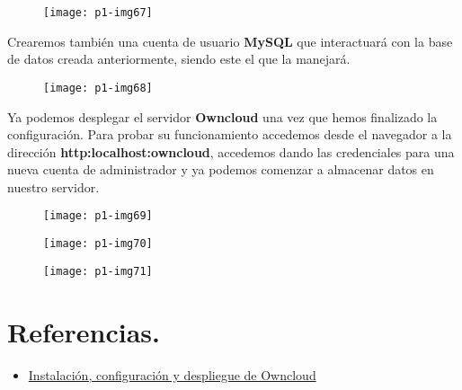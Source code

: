 \documentclass[10pt]{article}
\begin{document}
\begin{figure}[H]
	\begin{center}
 		\texttt{[image: p1-img67]}
	\end{center} 
\end{figure}

Crearemos también una cuenta de usuario \textbf{MySQL} que interactuará con la base de datos creada anteriormente, siendo este el que la manejará.\\

\begin{figure}[H]
	\begin{center}
 		\texttt{[image: p1-img68]}
	\end{center} 
\end{figure}

Ya podemos desplegar el servidor \textbf{Owncloud} una vez que hemos finalizado la configuración. Para probar su funcionamiento accedemos desde el navegador a la dirección \textbf{http:localhost:owncloud}, accedemos dando las credenciales para una nueva cuenta de administrador y ya podemos comenzar a almacenar datos en nuestro servidor.\\

\begin{figure}[H]
	\begin{center}
 		\texttt{[image: p1-img69]}
	\end{center} 
\end{figure}

\begin{figure}[H]
	\begin{center}
 		\texttt{[image: p1-img70]}
	\end{center} 
\end{figure}


\begin{figure}[H]
	\begin{center}
 		\texttt{[image: p1-img71]}
	\end{center} 
\end{figure}


\section{Referencias.}
\begin{itemize}
	\item \href{https://www.digitalocean.com/community/tutorials/how-to-install-and-configure-owncloud-on-ubuntu-16-04}{Instalación, configuración y despliegue de Owncloud}
\end{itemize}
\end{document}

